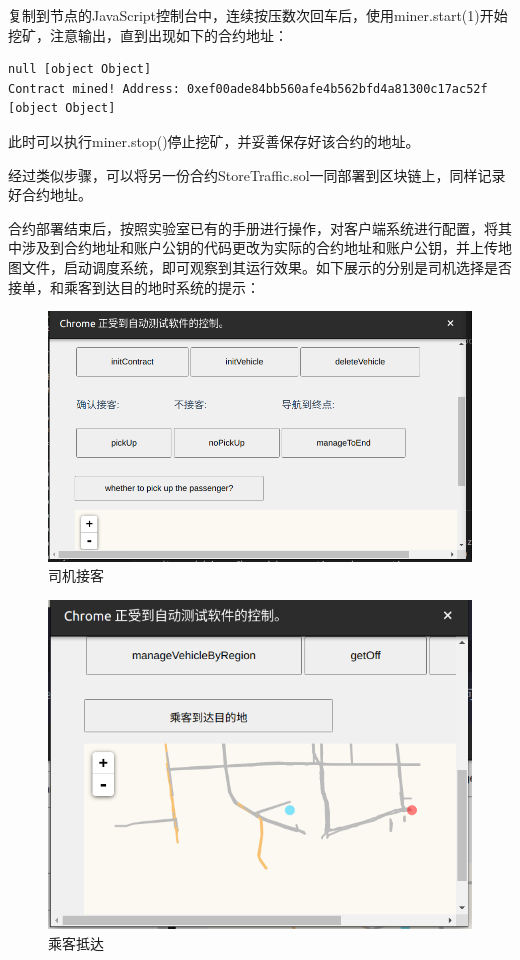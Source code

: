 复制到节点的JavaScript控制台中，连续按压数次回车后，使用miner.start(1)开始挖矿，注意输出，直到出现如下的合约地址：
\begin{lstlisting}[caption={挖矿输出合约地址}]
null [object Object]
Contract mined! Address: 0xef00ade84bb560afe4b562bfd4a81300c17ac52f
[object Object]
\end{lstlisting}

此时可以执行miner.stop()停止挖矿，并妥善保存好该合约的地址。

经过类似步骤，可以将另一份合约StoreTraffic.sol一同部署到区块链上，同样记录好合约地址。

合约部署结束后，按照实验室已有的手册进行操作，对客户端系统进行配置，将其中涉及到合约地址和账户公钥的代码更改为实际的合约地址和账户公钥，并上传地图文件，启动调度系统，即可观察到其运行效果。如下展示的分别是司机选择是否接单，和乘客到达目的地时系统的提示：

\begin{figure}[htbp]
  \centering
  \includegraphics[width=0.9\linewidth]{images/司机接客.png}
  \caption{司机接客}\label{司机接客} %
\end{figure}

\begin{figure}[htbp]
  \centering
  \includegraphics[width=0.9\linewidth]{images/乘客抵达.png}
  \caption{乘客抵达}\label{乘客抵达} %
\end{figure}

